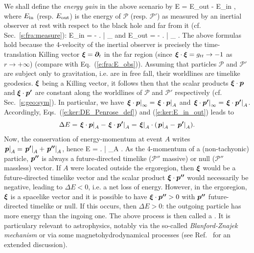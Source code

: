 We shall define the \emph{energy gain} in the above scenario by
\be \label{e:ker:DE_Penrose_def}
    \Delta E = E_{\rm out} - E_{\rm in} ,
\ee
where $E_{\rm in}$ (resp. $E_{\rm out}$) is the energy of $\mathscr{P}$
(resp. $\mathscr{P}'$) as measured by an inertial observer at rest with respect to the black hole and far from it (cf. Sec.~\ref{s:fra:measure}):
\be \label{e:ker:E_in_out}
    E_{\rm in} = - \left.  \w{\xi} \cdot {} \right| _{\infty}
    \qquad \mbox{and}\qquad
    E_{\rm out} = - \left.  \w{\xi} \cdot {} \right| _{\infty}  .
\ee
The above formulas hold because the 4-velocity of the inertial observer
is precisely the time-translation Killing vector $\bm{\xi} = \bm{\partial}_t$
in the far region (since $\bm{\xi}\cdot\bm{\xi} = g_{tt}  \rightarrow -1$
as  $r\rightarrow +\infty$) (compare with Eq.~(\ref{e:fra:E_obs})).
Assuming that particles $\mathscr{P}$
and $\mathscr{P}'$ are subject only to gravitation, i.e. are in free fall,
their worldlines are timelike geodesics. $\bm{\xi}$ being a Killing vector,
it follows then that the scalar products $\bm{\xi} \cdot \bm{p}$ and
$\bm{\xi} \cdot \bm{p'}$ are constant along the worldlines of $\mathscr{P}$
and $\mathscr{P}'$ respectively (cf. Sec.~\ref{s:geo:sym}). In particular, we have
$\left. \bm{\xi} \cdot \bm{p} \right| _{\infty} = \left. \bm{\xi} \cdot \bm{p} \right| _{A}$
and $\left. \bm{\xi} \cdot \bm{p'} \right| _{\infty} = \left. \bm{\xi} \cdot \bm{p'} \right| _{A}$. Accordingly, Eqs.~(\ref{e:ker:DE_Penrose_def}) and
(\ref{e:ker:E_in_out}) leads to
\[
    \Delta E = \left. \bm{\xi} \cdot \bm{p} \right| _{A} - \left. \bm{\xi} \cdot \bm{p'} \right| _{A} =
    \left.  \bm{\xi} \right| _{A} \cdot (\left. \bm{p} \right| _{A}
        - \left. \bm{p'} \right| _{A}) .
\]
Now, the conservation of energy-momentum at event $A$
writes $\left. \bm{p} \right| _{A} = \left. \bm{p'} \right| _{A} + \left. \bm{p''} \right| _{A}$, hence
\be \label{e:ker:DE_Penrose}
    \Delta E =   \left. \w{\xi} \cdot {} \right| _{A} .
\ee
As the 4-momentum of a (non-tachyonic) particle, $\bm{p''}$ is always a
future-directed timelike ($\mathscr{P}''$ massive) or null ($\mathscr{P}''$ massless) vector.
If $A$ were located outside the ergoregion, then $\bm{\xi}$ would be a
future-directed timelike vector and the scalar product
$ \bm{\xi} \cdot  \bm{p''}$ would necessarily be negative, leading to
$\Delta E < 0$, i.e. a net loss of energy. However, in the ergoregion,
$\bm{\xi}$ is a spacelike vector and it is possible to have $\bm{\xi} \cdot \bm{p''} > 0$
with $\bm{p''}$ future-directed timelike or null.
If this occurs, then $\Delta E > 0$: the outgoing particle has more energy
than the ingoing one. The above process is then called a
.
It is particulary relevant to astrophysics, notably via the so-called
\emph{Blanford-Znajek mechanism} or via
some magnetohydrodynamical processes (see Ref.~\cite{LasotGATN14} for an extended
discussion).

